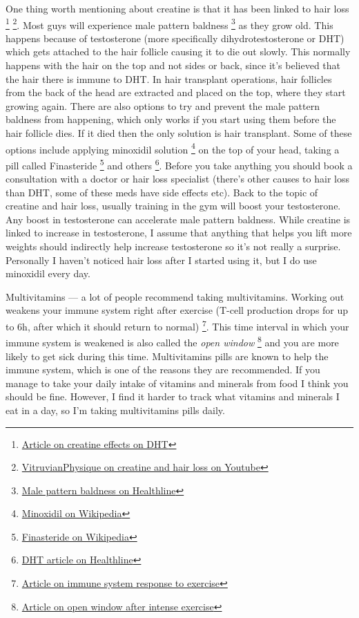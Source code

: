 \documentclass[openany, 12pt]{book}
\begin{document}
        One thing worth mentioning about creatine is that it has been linked to hair loss
        \footnote{\href{https://pubmed.ncbi.nlm.nih.gov/19741313/}{Article on creatine effects on DHT}}
        \footnote{\href{https://www.youtube.com/watch?v=NgcfEMu_WSE}{VitruvianPhysique on creatine and hair loss on Youtube}}.
        Most guys will experience male pattern baldness
        \footnote{\href{https://www.healthline.com/health/male-pattern-baldness}{Male pattern baldness on Healthline}} as they grow old. This happens because of testosterone (more specifically
        dihydrotestosterone or DHT) which gets attached to the hair follicle causing it to die out slowly. This normally happens with the hair on the top and not sides or back, since it's believed that
        the hair there is immune to DHT. In hair transplant operations, hair follicles from the back of the head are extracted and placed on the top, where they start growing again.
        There are also options to try and prevent the male pattern baldness from happening, which only works if you start using them before the hair follicle dies. If it died then 
        the only solution is hair transplant. Some of these options include applying minoxidil solution
        \footnote{\href{https://en.wikipedia.org/wiki/Minoxidil}{Minoxidil on Wikipedia}} on the top of your head, taking a pill called Finasteride
        \footnote{\href{https://en.wikipedia.org/wiki/Finasteride}{Finasteride on Wikipedia}} and others
        \footnote{\href{https://www.healthline.com/health/dht}{DHT article on Healthline}}. Before you take anything you should book a consultation with a doctor or hair loss specialist
        (there's other causes to hair loss than DHT, some of these meds have side effects etc).
        Back to the topic of creatine and hair loss, usually training in the gym will boost your testosterone. Any boost in testosterone can accelerate male pattern baldness. While creatine is linked
        to increase in testosterone, I assume that anything that helps you lift more weights should indirectly help increase testosterone so it's not really a surprise.
        Personally I haven't noticed hair loss after I started using it, but I do use minoxidil every day.

        Multivitamins --- a lot of people recommend taking multivitamins. Working out weakens your immune system right after exercise
        (T-cell production drops for up to 6h, after which it should return to normal)
        \footnote{\href{https://pubmed.ncbi.nlm.nih.gov/17037088/}{Article on immune system response to exercise}}.
        This time interval in which your immune system is weakened is also called the \textit{open window}
        \footnote{\href{https://pubmed.ncbi.nlm.nih.gov/20839496/}{Article on open window after intense exercise}} and you are more likely to get sick during this time.
        Multivitamins pills are known to help the immune system, which is one of the reasons they are recommended. If you manage to take your daily intake of vitamins and minerals from food I think
        you should be fine.
        However, I find it harder to track what vitamins and minerals I eat in a day, so I'm taking multivitamins pills daily.
\end{document}

